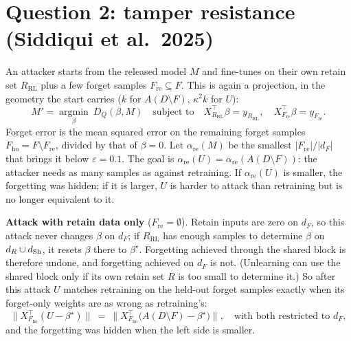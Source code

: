\documentclass[10pt]{article}
\begin{document}
\section{Question 2: tamper resistance (Siddiqui et al.\ 2025)}
An attacker starts from the released model $M$ and fine-tunes on their own retain set $R_{\mathrm{RL}}$ plus a few forget samples $F_{\mathrm{re}}\subseteq F$. This is again a projection, in the geometry the start carries ($k$ for $A(D\setminus F)$, $\kappa^2k$ for $U$):
\[
M'=\operatorname*{argmin}_\beta\ D_Q(\beta,M)\quad\text{subject to}\quad X_{R_{\mathrm{RL}}}^\top\beta=y_{R_{\mathrm{RL}}},\quad X_{F_{\mathrm{re}}}^\top\beta=y_{F_{\mathrm{re}}} .
\]
Forget error is the mean squared error on the remaining forget samples $F_{\mathrm{ho}}=F\setminus F_{\mathrm{re}}$, divided by that of $\beta=0$. Let $\alpha_{\mathrm{re}}(M)$ be the smallest $|F_{\mathrm{re}}|/|d_F|$ that brings it below $\varepsilon=0.1$. The goal is $\alpha_{\mathrm{re}}(U)=\alpha_{\mathrm{re}}(A(D\setminus F))$: the attacker needs as many samples as against retraining. If $\alpha_{\mathrm{re}}(U)$ is smaller, the forgetting was hidden; if it is larger, $U$ is harder to attack than retraining but is no longer equivalent to it.

\textbf{Attack with retain data only} ($F_{\mathrm{re}}=\emptyset$). Retain inputs are zero on $d_F$, so this attack never changes $\beta$ on $d_F$; if $R_{\mathrm{RL}}$ has enough samples to determine $\beta$ on $d_R\cup d_{\mathrm{Sh}}$, it resets $\beta$ there to $\beta^\star$. Forgetting achieved through the shared block is therefore undone, and forgetting achieved on $d_F$ is not. (Unlearning can use the shared block only if its own retain set $R$ is too small to determine it.) So after this attack $U$ matches retraining on the held-out forget samples exactly when its forget-only weights are as wrong as retraining's:
\[
\big\|X_{F_{\mathrm{ho}}}^\top(U-\beta^\star)\big\|\ =\ \big\|X_{F_{\mathrm{ho}}}^\top\big(A(D\setminus F)-\beta^\star\big)\big\|,\quad\text{with both restricted to } d_F ,
\]
and the forgetting was hidden when the left side is smaller.
\end{document}
